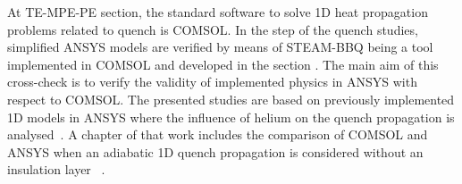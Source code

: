 
At TE-MPE-PE section, the standard software to solve 1D heat propagation problems related to quench is COMSOL. In the  step of the quench studies, simplified ANSYS models are verified by means of STEAM-BBQ being a tool implemented in COMSOL and developed in the section \cite{BBQ_manual}. The main aim of this cross-check is to verify the validity of implemented physics in ANSYS with respect to COMSOL. The presented studies are based on previously implemented 1D models in ANSYS where the influence of helium on the quench propagation is analysed~\cite{paudel_thesis}. A chapter of that work includes the comparison of COMSOL and ANSYS when an adiabatic 1D quench propagation is considered without an insulation layer~\cite{paudel_thesis} .
